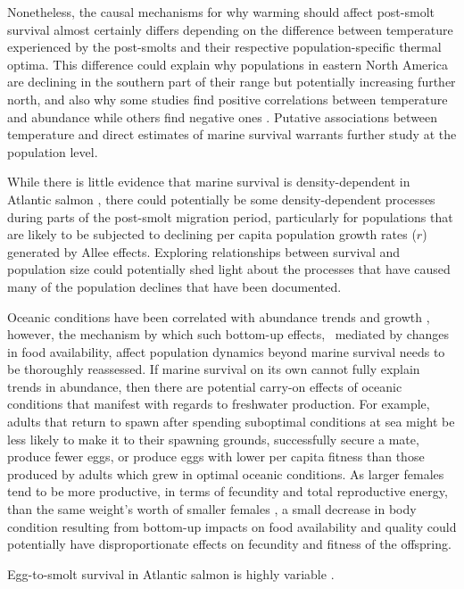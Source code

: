 \documentclass[12pt]{article}
\begin{document}
Nonetheless, the causal mechanisms for why warming should affect post-smolt
survival almost certainly differs depending on the difference between
temperature experienced by the post-smolts and their respective
population-specific thermal optima. 
This difference could explain why populations in eastern North America are
declining in the southern part of their range but potentially increasing
further north, and also why some studies find positive correlations between
temperature and abundance \citep{Friedland1998, Friedland1998b, Jonsson2004}
while others find negative ones \citep{Friedland1993, Todd2008}.
Putative associations between temperature and direct estimates of marine
survival warrants further study at the population level.

While there is little evidence that marine survival is density-dependent in
Atlantic salmon \citep{Jonsson1998,Gibson2006}, there could potentially be
some density-dependent processes during parts of the post-smolt migration
period, particularly for populations that are likely to be subjected to
declining per capita population growth rates ($r$) generated by Allee effects.
Exploring relationships between survival and population size could potentially
shed light about the processes that have caused many of the population
declines that have been documented.

Oceanic conditions have been correlated with abundance trends and growth
\citep{Todd2008}, however, the mechanism by which such bottom-up effects, \
mediated by changes in food availability,
affect population dynamics beyond marine survival needs to
be thoroughly reassessed. If marine survival on its own cannot fully explain
trends in abundance, then there are potential carry-on effects of oceanic
conditions that manifest with regards to freshwater production. 
For example, adults
that return to spawn after spending suboptimal conditions at sea might be less
likely to make it to their spawning grounds, successfully secure a mate,
produce fewer eggs, or produce eggs with lower per capita fitness than those
produced by adults which grew in optimal oceanic conditions.
As larger females tend to be more productive, in terms of fecundity and total
reproductive energy, than the same weight's worth of smaller females
\citep{Barneche2018}, a small decrease in body condition resulting from bottom-up
impacts on food availability and quality could potentially have disproportionate effects on fecundity
and fitness of the offspring.

Egg-to-smolt survival in Atlantic salmon is highly variable \citep{Klemetsen2003,Chaput2015}.
\end{document}
